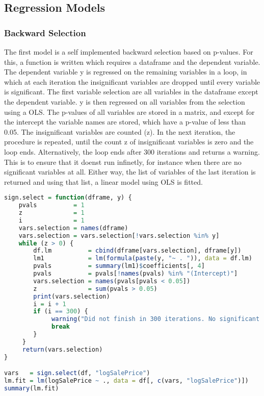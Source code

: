 \subsection{Regression Models}
\subsubsection{Backward Selection}
The first model is a self implemented backward selection based on p-values. For this, a function is written which requires a dataframe and the dependent variable. The dependent variable y is regressed on the remaining variables 
in a loop, in which at each iteration the insignificant variables
are dropped until every variable is significant. 
The first variable selection are all variables in the dataframe except the dependent variable. y is then regressed on all variables from the selection using a OLS. The p-values of all variables are stored in a matrix, and except
for the intercept the variable names are stored, which have a p-value
of less than 0.05. The insignificant variables are counted (z).  In the next iteration, the procedure is repeated,
until the count z of insignificant variables is zero and the loop
ends. Alternatively, the loop ends after 300 iterations and returns a warning. This is to ensure
that it doenst run infinetly, for instance when there are no significant variables at all. 
Either way, the list of variables of the last iteration is returned and using that list,  a linear model using OLS is fitted. 


\begin{lstlisting}[language=R]
sign.select = function(dframe, y) {
    pvals          = 1
    z              = 1
    i              = 1
    vars.selection = names(dframe)
    vars.selection = vars.selection[!vars.selection %in% y]
    while (z > 0) {
        df.lm          = cbind(dframe[vars.selection], dframe[y])
        lm1            = lm(formula(paste(y, "~ . ")), data = df.lm)
        pvals          = summary(lm1)$coefficients[, 4]
        pvals          = pvals[!names(pvals) %in% "(Intercept)"]
        vars.selection = names(pvals[pvals < 0.05])
        z              = sum(pvals > 0.05)
        print(vars.selection)
        i = i + 1
        if (i == 300) {
             warning("Did not finish in 300 iterations. No significant variables in data set?")
             break
        }
     }
     return(vars.selection)
}

vars   = sign.select(df, "logSalePrice")
lm.fit = lm(logSalePrice ~ ., data = df[, c(vars, "logSalePrice")])
summary(lm.fit)
\end{lstlisting}
